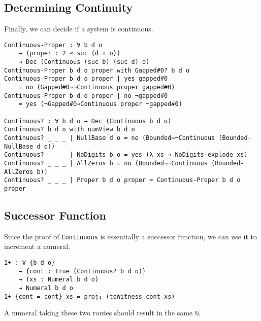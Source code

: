 \documentclass[\main/thesis.tex]{subfiles}
\begin{document}
\subsection{Determining Continuity}

Finally, we can decide if a system is continuous.

\begin{lstlisting}[basicstyle=\ttfamily\scriptsize]
Continuous-Proper : ∀ b d o
    → (proper : 2 ≤ suc (d + o))
    → Dec (Continuous (suc b) (suc d) o)
Continuous-Proper b d o proper with Gapped#0? b d o
Continuous-Proper b d o proper | yes gapped#0
    = no (Gapped#0⇒¬Continuous proper gapped#0)
Continuous-Proper b d o proper | no ¬gapped#0
    = yes (¬Gapped#0⇒Continuous proper ¬gapped#0)

Continuous? : ∀ b d o → Dec (Continuous b d o)
Continuous? b d o with numView b d o
Continuous? _ _ _ | NullBase d o = no (Bounded⇒¬Continuous (Bounded-NullBase d o))
Continuous? _ _ _ | NoDigits b o = yes (λ xs → NoDigits-explode xs)
Continuous? _ _ _ | AllZeros b = no (Bounded⇒¬Continuous (Bounded-AllZeros b))
Continuous? _ _ _ | Proper b d o proper = Continuous-Proper b d o proper
\end{lstlisting}

\subsection{Successor Function}

Since the proof of \lstinline|Continuous| is essentially a successor function,
we can use it to increment a numeral.

\begin{lstlisting}
1+ : ∀ {b d o}
    → {cont : True (Continuous? b d o)}
    → (xs : Numeral b d o)
    → Numeral b d o
1+ {cont = cont} xs = proj₁ (toWitness cont xs)
\end{lstlisting}

A numeral taking these two routes should result in the same {{\lstinline|ℕ|}}.

\begin{center}
\end{center}
\end{document}
